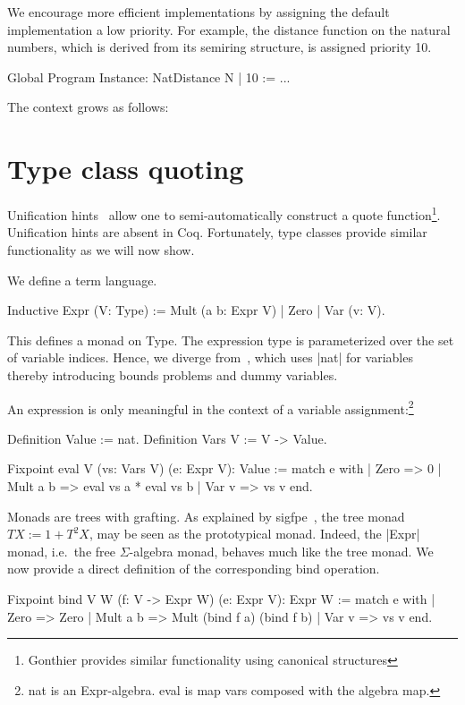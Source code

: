 \documentclass[a4paper,10pt, runningheads]{llncs}
\begin{document}
We encourage more efficient implementations by assigning the default implementation a
low priority. For example, the distance function on the natural numbers, which is derived from its
semiring structure, is assigned priority 10.
\begin{code}
  Global Program Instance: NatDistance N | 10 := ...
\end{code}

The context grows as follows:

\section{Type class quoting}\label{quote}
Unification hints~\cite{Hints} allow one to semi-automatically construct a quote
function\footnote{Gonthier provides similar functionality using canonical structures}.
Unification hints are absent in Coq. Fortunately, type classes provide similar functionality as
we will now show.

We define a term language.
\begin{code}
Inductive Expr (V: Type) := Mult (a b: Expr V) | Zero | Var (v: V).
\end{code}
This defines a monad on Type.
The expression type is parameterized over the set of variable indices. Hence, we diverge
 from~\cite{Hints}, which uses |nat| for variables thereby introducing bounds problems and
 dummy variables.

\noindent An expression is only meaningful in the context of a variable assignment:\footnote{nat is
an Expr-algebra. eval is map vars composed with the algebra map.}
\begin{code}
Definition Value := nat.
Definition Vars V := V -> Value.

Fixpoint eval {V} (vs: Vars V) (e: Expr V): Value :=
  match e with
  | Zero => 0
  | Mult a b => eval vs a * eval vs b
  | Var v => vs v
  end.
\end{code}
%
Monads are trees with grafting. As explained by sigfpe~\cite{MonadsGrafting}, the tree monad
$TX:=1+T^2X$, may be seen as the prototypical monad. Indeed, the |Expr| monad, i.e.\ the free
$\Sigma$-algebra monad, behaves much like the tree monad. We now provide a direct definition of the
corresponding bind operation.

\begin{code}
Fixpoint bind {V W} (f: V -> Expr W) (e: Expr V): Expr W :=
  match e with
  | Zero => Zero
  | Mult a b => Mult (bind f a) (bind f b)
  | Var v => vs v
  end.
\end{code}
\end{document}
